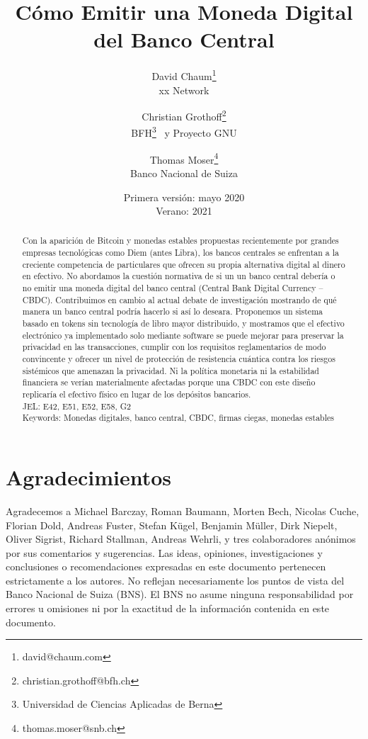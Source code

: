 \documentclass[10pt,spanish]{article}
\begin{document}
\title{Cómo Emitir una Moneda Digital del Banco Central}
\author{David Chaum\footnote{david@chaum.com} \\
  xx Network \and
  Christian Grothoff\footnote{christian.grothoff@bfh.ch} \\
  BFH\footnote{Universidad de Ciencias Aplicadas de Berna}
  ~y Proyecto GNU \and
  Thomas Moser\footnote{thomas.moser@snb.ch}\\
  Banco Nacional de Suiza}
\date{Primera versión: mayo 2020 \\
      Verano: 2021}
\maketitle

\renewcommand{\abstractname}{Resumen}
\renewcommand{\refname}{Referencias}

\begin{abstract}%
Con la aparición de Bitcoin y monedas estables propuestas recientemente
por grandes empresas tecnológicas como Diem (antes Libra), los bancos
centrales se enfrentan a la creciente competencia de particulares que
ofrecen su propia alternativa digital al dinero en efectivo. No
abordamos la cuestión normativa de si un un banco central debería o no
emitir una moneda digital del banco central (Central Bank Digital
Currency -- CBDC). Contribuimos en cambio al actual debate de
investigación mostrando de qué manera un banco central podría hacerlo si
así lo deseara. Proponemos un sistema basado en tokens sin tecnología de
libro mayor distribuido, y mostramos que el efectivo electrónico ya
implementado solo mediante software se puede mejorar para preservar la
privacidad en las transacciones, cumplir con los requisitos
reglamentarios de modo convincente y ofrecer un nivel de protección de
resistencia cuántica contra los riesgos sistémicos que amenazan la
privacidad. Ni la política monetaria ni la estabilidad financiera se
verían materialmente afectadas porque una CBDC con este diseño
replicaría el efectivo físico en lugar de los depósitos bancarios. \\
JEL: E42, E51, E52, E58, G2
\\
Keywords: Monedas digitales, banco central, CBDC, firmas ciegas, monedas
estables
\end{abstract}
\vspace{20pt}
\vspace{20pt}


\section*{Agradecimientos}
Agradecemos a Michael Barczay, Roman Baumann, Morten Bech, Nicolas Cuche,
Florian Dold, Andreas Fuster, Stefan Kügel, Benjamin Müller, Dirk Niepelt,
Oliver Sigrist, Richard Stallman, Andreas Wehrli, y tres colaboradores
anónimos por sus comentarios y sugerencias. Las ideas, opiniones,
investigaciones y conclusiones o recomendaciones expresadas en este
documento pertenecen estrictamente a los autores. No reflejan
necesariamente los puntos de vista del Banco Nacional de Suiza (BNS). El
BNS no asume ninguna responsabilidad por errores u omisiones ni por la
exactitud de la información contenida en este documento.
\end{document}
